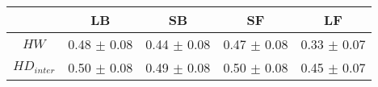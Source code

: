 \begin{tabular}{c c c c c }
\hline
 & LB & SB & SF & LF \\
\hline
$HW$ & 0.48 $\pm$ 0.08 & 0.44 $\pm$ 0.08 & 0.47 $\pm$ 0.08 & 0.33 $\pm$ 0.07 \\
$HD_{inter}$ & 0.50 $\pm$ 0.08 & 0.49 $\pm$ 0.08 & 0.50 $\pm$ 0.08 & 0.45 $\pm$ 0.07 \\
\hline
\end{tabular}